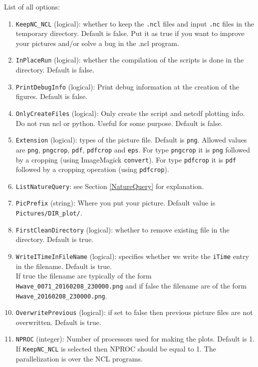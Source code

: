 \documentclass[12pt]{amsart}
\begin{document}
List of all options:
\begin{enumerate}
\item {\tt KeepNC\_NCL} (logical): whether to keep the {\tt .ncl} files and input {\tt .nc}
files in the temporary directory. Default is false. Put it as true if you want to improve
your pictures and/or solve a bug in the .ncl program.
\item {\tt InPlaceRun} (logical): whether the compilation of the scripts is done in the directory. Default is false.
\item {\tt PrintDebugInfo} (logical): Print debug information at the creation of the figures. Default is false.
\item {\tt OnlyCreateFiles} (logical): Only create the script and netcdf plotting info. Do not run ncl or python. Useful for some purpose. Default is false.
\item {\tt Extension} (logical): types of the picture file. Default is {\tt png}. Allowed values are {\tt png}, {\tt pngcrop}, {\tt pdf}, {\tt pdfcrop} and {\tt eps}. For type {\tt pngcrop} it is {\tt png} followed by a cropping (using ImageMagick {\tt convert}). For type {\tt pdfcrop} it is {\tt pdf} followed by a cropping operation (using {\tt pdfcrop}).
\item {\tt ListNatureQuery}: see Section \ref{NatureQuery} for explanation.
\item {\tt PicPrefix} (string): Where you put your picture. Default value is {\tt Pictures/DIR\_plot/}.
\item {\tt FirstCleanDirectory} (logical): whether to remove existing file in the directory. Default is true.
\item {\tt WriteITimeInFileName} (logical): specifies whether we write the {\tt iTime} entry in the filename. Default is true.\\
If true the filename are typically of the form {\tt Hwave\_0071\_20160208\_230000.png} and if false the filename are of the form {\tt Hwave\_20160208\_230000.png}.
\item {\tt OverwritePrevious} (logical): if set to false then previous picture files are not overwritten. Default is true.
\item {\tt NPROC} (integer): Number of processors used for making the plots. Default is 1. If {\tt KeepNC\_NCL} is selected then NPROC should be equal to 1. The parallelization is over the NCL programs.
\end{enumerate}
\end{document}
